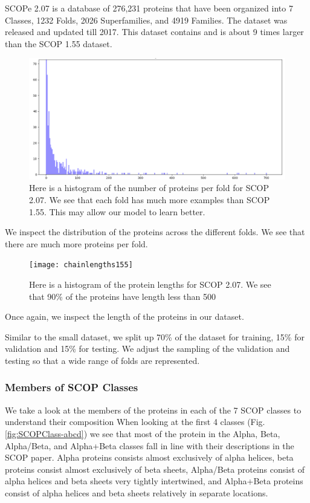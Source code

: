 \documentclass[12pt, a4paper, twocolumn, fullpage]{article}
\theoremstyle{plain}
\theoremstyle{definition}
\theoremstyle{remark}
\begin{document}
SCOPe 2.07 is a database of 276,231 proteins that have been organized into 7 Classes, 1232 Folds, 2026 Superfamilies, and 4919 Families. The dataset was released and updated till 2017. This dataset contains and is about 9 times larger than the SCOP 1.55 dataset.

\begin{figure}
    \includegraphics[width=\linewidth]{num_proteins_fold_155}
    \caption{Here is a histogram of the number of proteins per fold for SCOP 2.07. We see that each fold has much more examples than SCOP 1.55. This may allow our model to learn better.}
    \label{numproteinfold2.07}
\end{figure}

We inspect the distribution of the proteins across the different folds. We see that there are much more proteins per fold.

\begin{figure}
    \texttt{[image: chainlengths155]}
    \caption{Here is a histogram of the protein lengths for SCOP 2.07. We see that 90\% of the proteins have length less than 500}
    \label{chainlength2.07}
\end{figure}

Once again, we inspect the length of the proteins in our dataset.

Similar to the small dataset, we split up 70\% of the dataset for training, 15\% for validation and 15\% for testing. We adjust the sampling of the validation and testing so that a wide range of folds are represented.

\subsubsection{Members of SCOP Classes}

We take a look at the members of the proteins in each of the 7 SCOP classes to understand their composition When looking at the first 4 classes (Fig.\ref{fig:SCOPClass-abcd}) we see that most of the protein in the Alpha, Beta, Alpha/Beta, and Alpha+Beta classes fall in line with their descriptions in the SCOP paper. Alpha proteins consists almost exclusively of alpha helices, beta proteins consist almost exclusively of beta sheets, Alpha/Beta proteins consist of alpha helices and beta sheets very tightly intertwined, and Alpha+Beta proteins consist of alpha helices and beta sheets relatively in separate locations.
\end{document}
